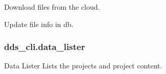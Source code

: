 \documentclass[letterpaper,10pt,english]{sphinxmanual}
\begin{document}
\begin{fulllineitems}
\begin{fulllineitems}
\label{\detokenize{dds_cli:dds_cli.data_getter.DataGetter.get}}
\sphinxAtStartPar
Download files from the cloud.

\end{fulllineitems}


\begin{fulllineitems}
\label{\detokenize{dds_cli:dds_cli.data_getter.DataGetter.update_db}}
\sphinxAtStartPar
Update file info in db.

\end{fulllineitems}


\end{fulllineitems}



\subsubsection{dds\_cli.data\_lister}
\label{\detokenize{dds_cli:module-dds_cli.data_lister}}\label{\detokenize{dds_cli:dds-cli-data-lister}}
\sphinxAtStartPar
Data Lister \textendash{} Lists the projects and project content.
\end{document}
